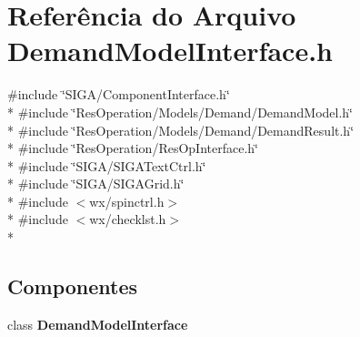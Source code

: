 \section{Referência do Arquivo Demand\+Model\+Interface.\+h}
\label{_demand_model_interface_8h}
{\ttfamily \#include \char`\"{}S\+I\+G\+A/\+Component\+Interface.\+h\char`\"{}}\\*
{\ttfamily \#include \char`\"{}Res\+Operation/\+Models/\+Demand/\+Demand\+Model.\+h\char`\"{}}\\*
{\ttfamily \#include \char`\"{}Res\+Operation/\+Models/\+Demand/\+Demand\+Result.\+h\char`\"{}}\\*
{\ttfamily \#include \char`\"{}Res\+Operation/\+Res\+Op\+Interface.\+h\char`\"{}}\\*
{\ttfamily \#include \char`\"{}S\+I\+G\+A/\+S\+I\+G\+A\+Text\+Ctrl.\+h\char`\"{}}\\*
{\ttfamily \#include \char`\"{}S\+I\+G\+A/\+S\+I\+G\+A\+Grid.\+h\char`\"{}}\\*
{\ttfamily \#include $<$wx/spinctrl.\+h$>$}\\*
{\ttfamily \#include $<$wx/checklst.\+h$>$}\\*
\subsection*{Componentes}
\begin{DoxyCompactItemize}
\item 
class {\bf Demand\+Model\+Interface}
\end{DoxyCompactItemize}
